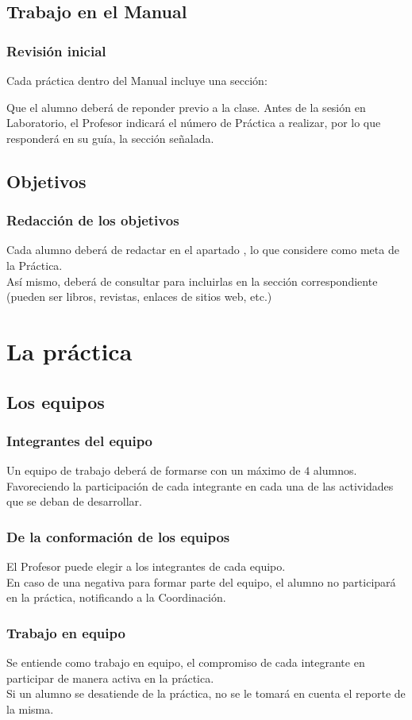 \documentclass[14pt]{beamer}
\begin{document}
\subsection{Trabajo en el Manual}

\begin{frame}
\frametitle{Revisión inicial}
Cada práctica dentro del Manual incluye una sección:
\pause
\begin{center}
\end{center}
\pause
Que el alumno deberá de reponder previo a la clase. \pause Antes de la sesión en Laboratorio, el Profesor indicará el número de Práctica a realizar, por lo que  responderá en su guía, la sección señalada.
\end{frame}

\subsection{Objetivos}

\begin{frame}
\frametitle{Redacción de los objetivos}
Cada alumno deberá de redactar en el apartado , lo que considere como meta de la Práctica.
\\
\bigskip
\pause
Así mismo, deberá de consultar  para incluirlas en la sección correspondiente (pueden ser libros, revistas, enlaces de sitios web, etc.)
\end{frame}

\section{La práctica}
\subsection{Los equipos}

\begin{frame}
\frametitle{Integrantes del equipo}
Un equipo de trabajo deberá de formarse con un máximo de $4$ alumnos.
\\
\bigskip
\pause
Favoreciendo la participación de cada integrante en cada una de las actividades que se deban de desarrollar.
\end{frame}
\begin{frame}
\frametitle{De la conformación de los equipos}
El Profesor puede elegir a los integrantes de cada equipo.
\\
\bigskip
\pause
En caso de una negativa para formar parte del equipo, el alumno no participará en la práctica, notificando a la Coordinación.
\end{frame}
\begin{frame}
\frametitle{Trabajo en equipo}
Se entiende como trabajo en equipo, el compromiso de cada integrante en participar de manera activa en la práctica.
\\
\bigskip
\pause
Si un alumno se desatiende de la práctica, no se le tomará en cuenta el reporte de la misma.
\end{frame}
\end{document}
